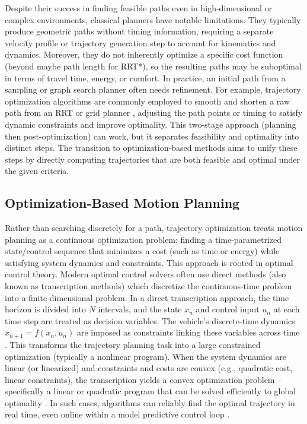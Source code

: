 Despite their success in finding feasible paths even in high-dimensional or complex environments, classical planners have notable limitations.
They typically produce geometric paths without timing information, requiring a separate velocity profile or trajectory generation step to account for
kinematics and dynamics.
Moreover, they do not inherently optimize a specific cost function (beyond maybe path length for RRT*), so the resulting paths may be suboptimal in
terms of travel time, energy, or comfort.
In practice, an initial path from a sampling or graph search planner often needs refinement.
For example, trajectory optimization algorithms are commonly employed to smooth and shorten a raw path from an RRT or grid planner
\cite{schulman_finding_2013}, adjusting the path points or timing to satisfy dynamic constraints and improve optimality.
This two-stage approach (planning then post-optimization) can work, but it separates feasibility and optimality into distinct steps.
The transition to optimization-based methods aims to unify these steps by directly computing trajectories that are both feasible and optimal under
the given criteria.

\subsection{Optimization-Based Motion Planning}
Rather than searching discretely for a path, trajectory optimization treats motion planning as a continuous optimization problem: finding a
time-parametrized state/control sequence that minimizes a cost (such as time or energy) while satisfying system dynamics and constraints.
This approach is rooted in optimal control theory.
Modern optimal control solvers often use direct methods (also known as transcription methods) which discretize the continuous-time problem into a
finite-dimensional problem.
In a direct transcription approach, the time horizon is divided into $N$ intervals, and the state $x_n$ and control input $u_n$ at each time step are
treated as decision variables.
The vehicle's discrete-time dynamics $x_{n+1} = f(x_n, u_n)$ are imposed as constraints linking these variables across time
\cite{tedrake2023trajopt}.
This transforms the trajectory planning task into a large constrained optimization (typically a nonlinear program).
When the system dynamics are linear (or linearized) and constraints and costs are convex (e.g., quadratic cost, linear constraints), the
transcription yields a convex optimization problem – specifically a linear or quadratic program that can be solved efficiently to global optimality
\cite{tedrake2023trajopt}.
In such cases, algorithms can reliably find the optimal trajectory in real time, even online within a model predictive control loop
\cite{tedrake2023trajopt}.

